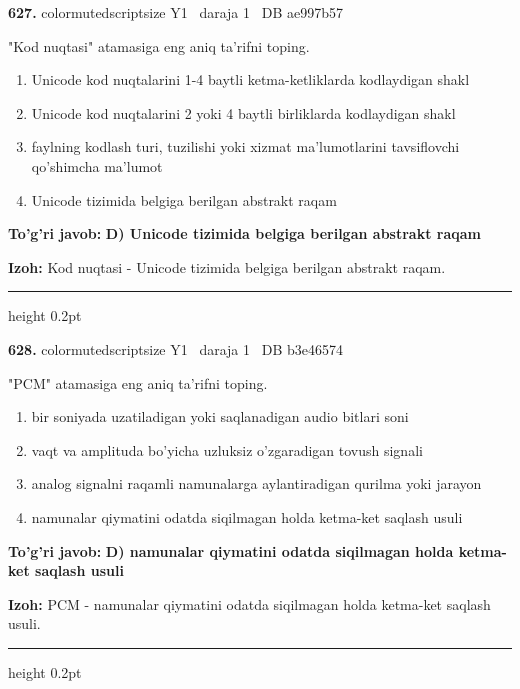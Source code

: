 \documentclass[10pt,a4paper,oneside]{article}
\begin{document}
\noindent\textbf{\color{ink}627.}  {color{muted}scriptsize Y1 \textbullet\ daraja 1 \textbullet\ DB ae997b57}
\par
"Kod nuqtasi" atamasiga eng aniq ta'rifni toping.
\begin{enumerate}[label=\Alph*),leftmargin=9mm]
\item Unicode kod nuqtalarini 1-4 baytli ketma-ketliklarda kodlaydigan shakl
\item Unicode kod nuqtalarini 2 yoki 4 baytli birliklarda kodlaydigan shakl
\item faylning kodlash turi, tuzilishi yoki xizmat ma'lumotlarini tavsiflovchi qo'shimcha ma'lumot
\item Unicode tizimida belgiga berilgan abstrakt raqam
\end{enumerate}
\begin{tcolorbox}[enhanced,breakable,colback=teal!4,colframe=teal!50!black,boxrule=0.5pt,arc=1.1mm,left=3mm,right=3mm,top=1.7mm,bottom=1.7mm,before skip=2mm,after skip=2mm]
\textbf{\color{teal}To'g'ri javob:} \textbf{D) Unicode tizimida belgiga berilgan abstrakt raqam}
\par\smallskip
\textbf{Izoh:} Kod nuqtasi - Unicode tizimida belgiga berilgan abstrakt raqam.
\end{tcolorbox}
\vspace{2mm}\hrule height 0.2pt \vspace{3mm}

\noindent\textbf{\color{ink}628.}  {color{muted}scriptsize Y1 \textbullet\ daraja 1 \textbullet\ DB b3e46574}
\par
"PCM" atamasiga eng aniq ta'rifni toping.
\begin{enumerate}[label=\Alph*),leftmargin=9mm]
\item bir soniyada uzatiladigan yoki saqlanadigan audio bitlari soni
\item vaqt va amplituda bo'yicha uzluksiz o'zgaradigan tovush signali
\item analog signalni raqamli namunalarga aylantiradigan qurilma yoki jarayon
\item namunalar qiymatini odatda siqilmagan holda ketma-ket saqlash usuli
\end{enumerate}
\begin{tcolorbox}[enhanced,breakable,colback=teal!4,colframe=teal!50!black,boxrule=0.5pt,arc=1.1mm,left=3mm,right=3mm,top=1.7mm,bottom=1.7mm,before skip=2mm,after skip=2mm]
\textbf{\color{teal}To'g'ri javob:} \textbf{D) namunalar qiymatini odatda siqilmagan holda ketma-ket saqlash usuli}
\par\smallskip
\textbf{Izoh:} PCM - namunalar qiymatini odatda siqilmagan holda ketma-ket saqlash usuli.
\end{tcolorbox}
\vspace{2mm}\hrule height 0.2pt \vspace{3mm}
\end{document}
